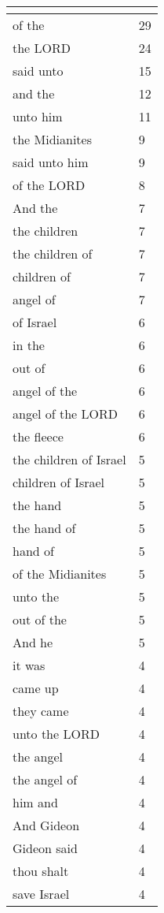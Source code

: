 \begin{center}
\begin{longtable}{|p{3.0in}|p{0.5in}|}
\hline \multicolumn{2}{c}{{ }} \\ \hline
\endfoot 
of the & 29\\ \hline 
the LORD & 24\\ \hline 
said unto & 15\\ \hline 
and the & 12\\ \hline 
unto him & 11\\ \hline 
the Midianites & 9\\ \hline 
said unto him & 9\\ \hline 
of the LORD & 8\\ \hline 
And the & 7\\ \hline 
the children & 7\\ \hline 
the children of & 7\\ \hline 
children of & 7\\ \hline 
angel of & 7\\ \hline 
of Israel & 6\\ \hline 
in the & 6\\ \hline 
out of & 6\\ \hline 
angel of the & 6\\ \hline 
angel of the LORD & 6\\ \hline 
the fleece & 6\\ \hline 
the children of Israel & 5\\ \hline 
children of Israel & 5\\ \hline 
the hand & 5\\ \hline 
the hand of & 5\\ \hline 
hand of & 5\\ \hline 
of the Midianites & 5\\ \hline 
unto the & 5\\ \hline 
out of the & 5\\ \hline 
And he & 5\\ \hline 
it was & 4\\ \hline 
came up & 4\\ \hline 
they came & 4\\ \hline 
unto the LORD & 4\\ \hline 
the angel & 4\\ \hline 
the angel of & 4\\ \hline 
him and & 4\\ \hline 
And Gideon & 4\\ \hline 
Gideon said & 4\\ \hline 
thou shalt & 4\\ \hline 
save Israel & 4\\ \hline 

\end{longtable}
\end{center}
